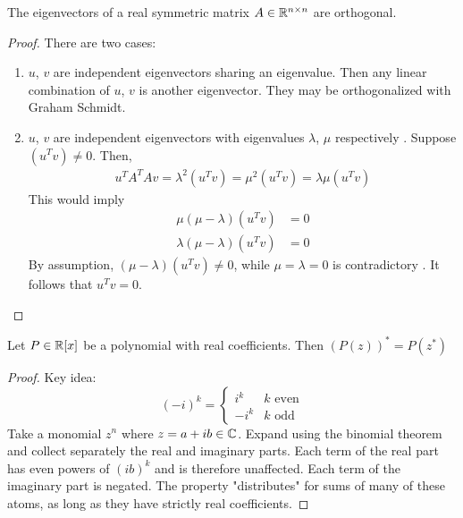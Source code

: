 \documentclass{article}
\newcommand{\an}[1]{{\leavevmode\color{red}{#1}}}
\begin{document}
\begin{theorem}
The eigenvectors of a real symmetric matrix $A \in {\mathbb R}^{n \times n}$ are orthogonal. 
\end{theorem}
\begin{proof}
There are two cases:
\begin{enumerate}
  \item $u$, $v$ are independent eigenvectors sharing an eigenvalue. Then any linear combination of $u$, $v$ is another eigenvector. They may be orthogonalized with Graham \an{Gram} Schmidt. 
    
  \item $u$, $v$ are independent eigenvectors with eigenvalues $\lambda$, $\mu$ respectively \an{(Is it possible to choose linearly independent eigenvectors?)}. Suppose  $(u^T v) \not = 0$. \an{Do you mean $u^T$ or $u^H$ here?} Then,
    \begin{align}
        u^T A^T A v = \lambda^2 (u^T v) = \mu^2 (u^T v) = \lambda \mu (u^T v)
    \end{align}
    This would imply
    \begin{align}
        \mu(\mu - \lambda) (u^T v) & = 0 \\
        \lambda(\mu - \lambda) (u^T v) & = 0
    \end{align}
    By assumption, $(\mu - \lambda) (u^T v) \not = 0$, while $\mu = \lambda = 0$ is contradictory \an{(you don't seem to have assumed anything that would contradict this)}. It follows that $u^T v = 0$.
    \an{The above is a little too complicated. Just work on $u^T A v$.}
\end{enumerate} 
\end{proof}

\an{Again, not sure why the lemma below is relevant.}
\begin{lemma} \label{lem:polyconj}
Let $P \in {\mathbb R}[x]$ be a polynomial with real coefficients. Then $(P(z))^* = P(z^*)$
\end{lemma}
\begin{proof}
Key idea: 
\begin{equation} \label{eqn:imag}
    (-i)^k = \begin{cases}
    i^k & k \text{ even} \\
    -i^k & k \text { odd}
    \end{cases}
\end{equation}
Take a monomial $z^n$ where $z = a + ib \in {\mathbb C}$. Expand using the binomial theorem and collect separately the real and imaginary parts. Each term of the real part has even powers of $(ib)^k$ and is therefore unaffected. Each term of the imaginary part is negated. The property "distributes" for sums of many of these atoms, as long as they have strictly real coefficients.
\end{proof}
\end{document}
